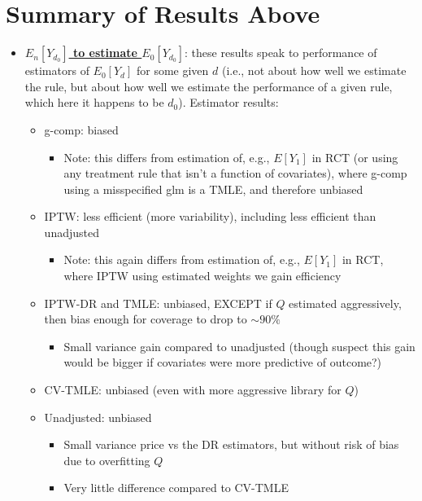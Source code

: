 \documentclass[11pt]{article}\usepackage[]{graphicx}\usepackage[]{color}
\begin{document}
\section{Summary of Results Above}

\begin{itemize}
    \item \underline{\textbf{$E_n[Y_{d_0}]$ to estimate $E_0[Y_{d_0}]$}}: these results speak to performance of estimators of $E_0[Y_{d}]$ for some given $d$ (i.e., not about how well we estimate the rule, but about how well we estimate the performance of a given rule, which here it happens to be $d_0$). Estimator results:
    \begin{itemize}
        \item g-comp: biased
        \begin{itemize}
            \item Note: this differs from estimation of, e.g., $E[Y_1]$ in RCT (or using any treatment rule that isn't a function of covariates), where g-comp using a misspecified glm is a TMLE, and therefore unbiased
        \end{itemize}
        \item IPTW: less efficient (more variability), including less efficient than unadjusted
        \begin{itemize}
            \item Note: this again differs from estimation of, e.g., $E[Y_1]$ in RCT, where IPTW using estimated weights we gain efficiency
        \end{itemize}
        \item IPTW-DR and TMLE: unbiased, EXCEPT if $Q$ estimated aggressively, then bias enough for coverage to drop to $\sim 90\%$
        \begin{itemize}
            \item Small variance gain compared to unadjusted (though suspect this gain would be bigger if covariates were more predictive of outcome?)
        \end{itemize}
\item CV-TMLE: unbiased (even with more aggressive library for $Q$)
\item Unadjusted: unbiased
\begin{itemize}
    \item Small variance price vs the DR estimators, but without risk of bias due to overfitting $Q$
    \item Very little difference compared to CV-TMLE
\end{itemize}

\end{itemize}
\end{itemize}
\end{document}
